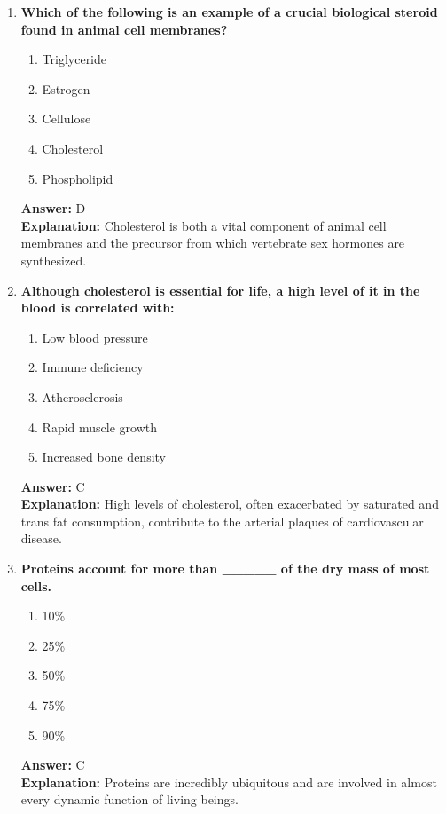 \documentclass[11pt, a4paper]{article}
\begin{document}
\begin{enumerate}
\item \textbf{Which of the following is an example of a crucial biological steroid found in animal cell membranes?}
\begin{enumerate}[label=\Alph*.]
    \item Triglyceride
    \item Estrogen
    \item Cellulose
    \item Cholesterol
    \item Phospholipid
\end{enumerate}
\textbf{Answer:} D \\
\textbf{Explanation:} Cholesterol is both a vital component of animal cell membranes and the precursor from which vertebrate sex hormones are synthesized.

\item \textbf{Although cholesterol is essential for life, a high level of it in the blood is correlated with:}
\begin{enumerate}[label=\Alph*.]
    \item Low blood pressure
    \item Immune deficiency
    \item Atherosclerosis
    \item Rapid muscle growth
    \item Increased bone density
\end{enumerate}
\textbf{Answer:} C \\
\textbf{Explanation:} High levels of cholesterol, often exacerbated by saturated and trans fat consumption, contribute to the arterial plaques of cardiovascular disease.


\item \textbf{Proteins account for more than \_\_\_\_\_ of the dry mass of most cells.}
\begin{enumerate}[label=\Alph*.]
    \item 10\%
    \item 25\%
    \item 50\%
    \item 75\%
    \item 90\%
\end{enumerate}
\textbf{Answer:} C \\
\textbf{Explanation:} Proteins are incredibly ubiquitous and are involved in almost every dynamic function of living beings.


\end{enumerate}
\end{document}
